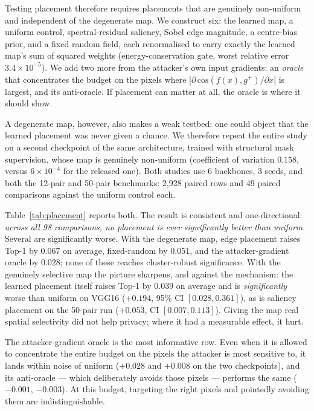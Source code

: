 \documentclass[10pt,journal]{IEEEtran}
\begin{document}
Testing placement therefore requires placements that are genuinely
non-uniform and independent of the degenerate map. We construct six: the
learned map, a uniform control, spectral-residual saliency, Sobel edge
magnitude, a centre-bias prior, and a fixed random field, each renormalised
to carry exactly the learned map's sum of squared weights (energy-conservation
gate, worst relative error $3.4\times10^{-5}$). We add two more from the
attacker's own input gradients: an \emph{oracle} that concentrates the budget
on the pixels where $|\partial\,\mathrm{cos}(f(x),g^{+})/\partial x|$ is
largest, and its anti-oracle. If placement can matter at all, the oracle is
where it should show.

A degenerate map, however, also makes a weak testbed: one could object that
the learned placement was never given a chance. We therefore repeat the entire
study on a second checkpoint of the same architecture, trained with structural
mask supervision, whose map is genuinely non-uniform (coefficient of variation
$0.158$, versus $6\times10^{-4}$ for the released one). Both studies use 6
backbones, 3 seeds, and both the 12-pair and 50-pair benchmarks: 2,928 paired
rows and 49 paired comparisons against the uniform control each.

Table~\ref{tab:placement} reports both. The result is consistent and
one-directional: \emph{across all 98 comparisons, no placement is ever
significantly better than uniform}. Several are significantly worse. With the
degenerate map, edge placement raises Top-1 by $0.067$ on average,
fixed-random by $0.051$, and the attacker-gradient oracle by $0.028$; none of
these reaches cluster-robust significance. With the genuinely selective map
the picture sharpens, and against the mechanism: the learned placement itself
raises Top-1 by $0.039$ on average and is \emph{significantly} worse than
uniform on VGG16 ($+0.194$, 95\% CI $[0.028, 0.361]$), as is saliency
placement on the 50-pair run ($+0.053$, CI $[0.007, 0.113]$). Giving the map
real spatial selectivity did not help privacy; where it had a measurable
effect, it hurt.

The attacker-gradient oracle is the most informative row. Even when it is
allowed to concentrate the entire budget on the pixels the attacker is most
sensitive to, it lands within noise of uniform ($+0.028$ and $+0.008$ on the
two checkpoints), and its anti-oracle --- which deliberately avoids those
pixels --- performs the same ($-0.001$, $-0.003$). At this budget, targeting
the right pixels and pointedly avoiding them are indistinguishable.
\end{document}
